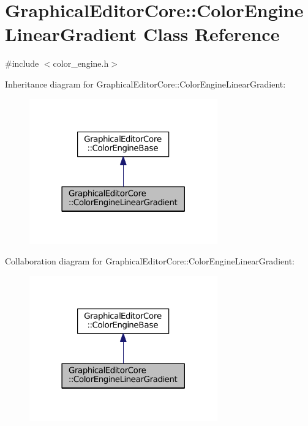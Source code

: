 \hypertarget{classGraphicalEditorCore_1_1ColorEngineLinearGradient}{}\section{Graphical\+Editor\+Core\+:\+:Color\+Engine\+Linear\+Gradient Class Reference}
\label{classGraphicalEditorCore_1_1ColorEngineLinearGradient}


{\ttfamily \#include $<$color\+\_\+engine.\+h$>$}



Inheritance diagram for Graphical\+Editor\+Core\+:\+:Color\+Engine\+Linear\+Gradient\+:
\nopagebreak
\begin{figure}[H]
\begin{center}
\leavevmode
\includegraphics[width=230pt]{classGraphicalEditorCore_1_1ColorEngineLinearGradient__inherit__graph}
\end{center}
\end{figure}


Collaboration diagram for Graphical\+Editor\+Core\+:\+:Color\+Engine\+Linear\+Gradient\+:
\nopagebreak
\begin{figure}[H]
\begin{center}
\leavevmode
\includegraphics[width=230pt]{classGraphicalEditorCore_1_1ColorEngineLinearGradient__coll__graph}
\end{center}
\end{figure}
